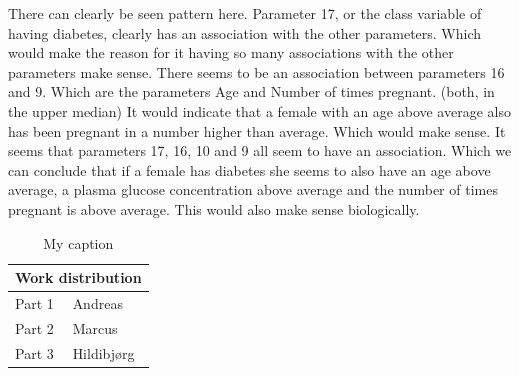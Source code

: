 There can clearly be seen pattern here. Parameter 17, or the class variable of having diabetes, clearly has an association with the other parameters.
Which would make the reason for it having so many associations with the other parameters make sense.
There seems to be an association between parameters 16 and 9. Which are the parameters Age and Number of times pregnant. (both, in the upper median)
It would indicate that a female with an age above average also has been pregnant in a number higher than average. Which would make sense.
It seems that parameters 17, 16, 10 and 9 all seem to have an association.
Which we can conclude that if a female has diabetes she seems to also have an age above average, a plasma glucose concentration above average and the number of times pregnant is above average.
This would also make sense biologically.




\begin{table}[H]
\centering
\caption{My caption}
\label{my-label}
\begin{tabular}{ll}
\hline
\multicolumn{2}{|l|}{Work distribution} \\ \hline
Part 1              & Andreas                \\
Part 2              & Marcus                 \\
Part 3              & Hildibjørg
\end{tabular}
\end{table}
